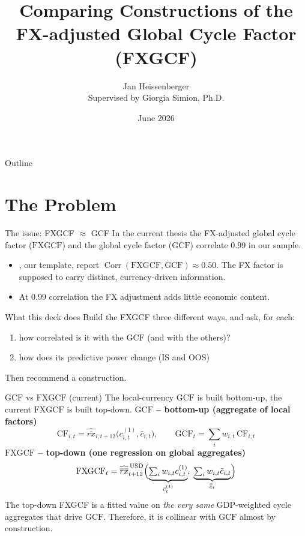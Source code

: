 \documentclass[10pt]{beamer}
\title[FXGCF construction comparison]{Comparing Constructions of the\\
  FX-adjusted Global Cycle Factor (FXGCF)}
\author[Jan Heissenberger]{Jan Heissenberger\\
  Supervised by Giorgia Simion, Ph.D.}
\date{June 2026}
\newcommand{\CF}{\mathrm{CF}}
\newcommand{\GCF}{\mathrm{GCF}}
\newcommand{\FXGCF}{\mathrm{FXGCF}}
\newcommand{\rxbar}{\overline{rx}}
\newcommand{\cyc}{c}
\newcommand{\cycbar}{\bar{c}}
\DeclareMathOperator{\Corr}{Corr}
\begin{document}
\begin{frame}
  \titlepage
\end{frame}

\begin{frame}{Outline}
  \tableofcontents
\end{frame}

\section{The Problem}

\begin{frame}{The issue: FXGCF $\approx$ GCF}
  In the current thesis the FX-adjusted global cycle factor
  ($\FXGCF$) and the global cycle factor ($\GCF$) correlate
  \alert{$0.99$} in our sample.
  \begin{itemize}
    \item \citet{dahlquist2013}, our template, report
      $\Corr(\FXGCF,\GCF)\approx \mathbf{0.50}$. The FX factor is supposed to
      carry distinct, currency-driven information.
    \item At $0.99$ correlation the FX adjustment adds little economic content.
  \end{itemize}
  \vfill
  \begin{block}{What this deck does}
    Build the FXGCF \alert{three different ways}, and ask, for each:
    \begin{enumerate}
      \item how correlated is it with the $\GCF$ (and with the others)?
      \item how does its predictive power change (IS and OOS)
    \end{enumerate}
    Then recommend a construction.
  \end{block}
\end{frame}

\begin{frame}{$\GCF$ vs $\FXGCF$ (current)}
  The local-currency $\GCF$ is built \alert{bottom-up}, the current $\FXGCF$ is
  built \alert{top-down}.
  \vfill
  \textbf{$\GCF$ -- bottom-up (aggregate of local factors)}
  \begin{equation*}
    \CF_{i,t}=\widehat{\rxbar}_{i,t+12}\bigl(\cyc^{(1)}_{i,t},\cycbar_{i,t}\bigr),
    \qquad
    \GCF_{t}=\sum_{i} w_{i,t}\,\CF_{i,t}
  \end{equation*}
  \textbf{$\FXGCF$ -- top-down (one regression on global aggregates)}
  \begin{equation*}
    \FXGCF_{t}=\widehat{\rxbar}^{\,\mathrm{USD}}_{t+12}
      \Bigl(\underbrace{\textstyle\sum_i w_{i,t}\cyc^{(1)}_{i,t}}_{\bar c^{(1)}_t},\;
            \underbrace{\textstyle\sum_i w_{i,t}\cycbar_{i,t}}_{\bar{\cycbar}_t}\Bigr)
  \end{equation*}
  \vfill
  The top-down FXGCF is a fitted value on \emph{the very same} GDP-weighted
  cycle aggregates that drive $\GCF$. Therefore, it is collinear with $\GCF$ almost by
  construction.
\end{frame}
\end{document}

